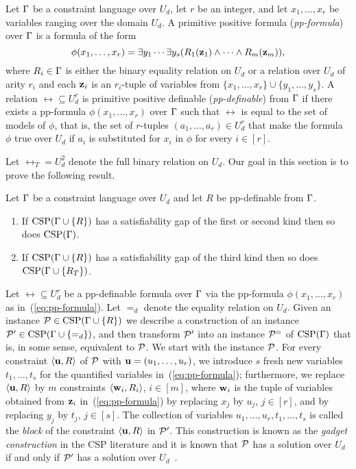 \documentclass[11pt,letter]{article}
\begin{document}
Let $\Gamma$ be a constraint language over $U_d$, let $r$ be an integer, and
let $x_1,\ldots,x_r$ be variables ranging over the domain $U_d$. A primitive
positive formula (\emph{pp-formula}) over $\Gamma$ is a formula of the form
\begin{equation}\label{eq:pp-formula}
  \phi(x_1,\ldots,x_r)=\exists y_1\cdots\exists y_s(R_1({\bf z}_1)\wedge\cdots\wedge
  R_m({\bf z}_m)),
\end{equation}
where $R_i\in\Gamma$ is either the binary equality relation on $U_d$ or a relation over $U_d$ of arity $r_i$ and each ${\bf z}_i$ is an $r_i$-tuple of variables from
$\{x_1,\ldots,x_r\}\cup\{y_1,\ldots,y_s\}$.
A relation $\rel\subseteq U_d^r$ is primitive positive definable
(\emph{pp-definable}) from $\Gamma$ if there
exists a pp-formula $\phi(x_1,\ldots,x_r)$ over $\Gamma$ such that $\rel$ is equal to the set of
models of $\phi$, that is, the set of $r$-tuples $(a_1,\ldots,a_r)\in U_d^r$
that make the formula $\phi$ true over $U_d$ if $a_i$ is
substituted for $x_i$ in $\phi$ for every $i\in [r]$.

Let $\rel_T=U_d^2$ denote the full binary relation on $U_d$.
Our goal in this section is to prove the following result.

\begin{theorem}\label{the:pp}
  Let $\Gamma$ be a constraint language over $U_d$ and let $R$ be pp-definable from
  $\Gamma$.
  \begin{enumerate}
    \item If ${\rm CSP}(\Gamma\cup\{R\})$ has a satisfiability gap of the first or second kind then so does ${\rm CSP}(\Gamma)$.
    \item If ${\rm CSP}(\Gamma\cup\{R\})$ has a satisfiability gap of the third kind then so does ${\rm CSP}(\Gamma\cup\{R_T\})$.
  \end{enumerate}
\end{theorem}

Let $\rel\subseteq U_d^r$ be a pp-definable formula
over $\Gamma$ via the pp-formula $\phi(x_1,\ldots,x_r)$ as
in~(\ref{eq:pp-formula}). Let $=_d$ denote the equality relation on $U_d$. 
Given an instance
${\mathcal P}\in{\rm CSP}(\Gamma\cup\{R\})$ we describe a construction of an instance
${\mathcal P}'\in{\rm CSP}(\Gamma\cup\{=_d\})$, and then transform ${\mathcal P}'$ into an instance ${\mathcal P}^=$ of ${\rm CSP}(\Gamma)$ that is, in some sense, equivalent to ${\mathcal P}$. 
We start with the instance ${\mathcal P}$. For every constraint $\langle {\bf u},R \rangle$ of ${\mathcal P}$ with
${\bf u}=(u_1,\ldots,u_r)$, we
introduce $s$ fresh new variables $t_1,\ldots,t_s$ for the quantified
variables in~(\ref{eq:pp-formula}); furthermore, we replace $\langle {\bf u},R \rangle$ by $m$ constraints
$\langle {\bf w}_i,R_i \rangle$, $i\in [m]$, where ${\bf w}_i$ is the tuple of variables obtained
from ${\bf z}_i$ in~(\ref{eq:pp-formula}) by replacing $x_j$ by $u_j$, $j\in [r]$,
and by replacing $y_j$ by $t_j$, $j\in [s]$.
The collection of variables $u_1,\ldots,u_r,t_1,\ldots,t_s$ is called the
\emph{block} of the constraint $\langle {\bf u},R \rangle$ in ${\mathcal P}'$.
This construction is known as the \emph{gadget construction} in the CSP
literature and it is known that ${\mathcal P}$ has a solution over $U_d$
if and only if ${\mathcal P}'$ has a solution over $U_d$~\cite{Bulatov05:classifying,BKW17}.
\end{document}
